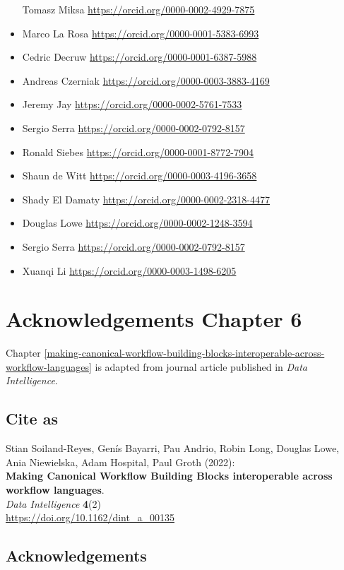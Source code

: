 \begin{itemize}
  Tomasz Miksa \url{https://orcid.org/0000-0002-4929-7875}
\item
  Marco La Rosa \url{https://orcid.org/0000-0001-5383-6993}
\item
  Cedric Decruw \url{https://orcid.org/0000-0001-6387-5988}
\item
  Andreas Czerniak \url{https://orcid.org/0000-0003-3883-4169}
\item
  Jeremy Jay \url{https://orcid.org/0000-0002-5761-7533}
\item
  Sergio Serra \url{https://orcid.org/0000-0002-0792-8157}
\item
  Ronald Siebes \url{https://orcid.org/0000-0001-8772-7904}
\item
  Shaun de Witt \url{https://orcid.org/0000-0003-4196-3658}
\item
  Shady El Damaty \url{https://orcid.org/0000-0002-2318-4477}
\item
  Douglas Lowe \url{https://orcid.org/0000-0002-1248-3594}
\item
  Sergio Serra \url{https://orcid.org/0000-0002-0792-8157}
\item
  Xuanqi Li \url{https://orcid.org/0000-0003-1498-6205}
\end{itemize}


\section{Acknowledgements Chapter 6}

Chapter \vref{making-canonical-workflow-building-blocks-interoperable-across-workflow-languages} is adapted from journal article published in \emph{Data Intelligence}.

\subsection*{Cite as}

Stian Soiland-Reyes, Genís Bayarri, Pau Andrio, Robin Long, Douglas
Lowe, Ania Niewielska, Adam Hospital, Paul Groth (2022):\\
\textbf{Making Canonical Workflow Building Blocks interoperable across
workflow languages}.\\
\emph{Data Intelligence} \textbf{4}(2)\\
\url{https://doi.org/10.1162/dint_a_00135}

\hypertarget{acknowledgements-3}{%
\subsection*{Acknowledgements}}

